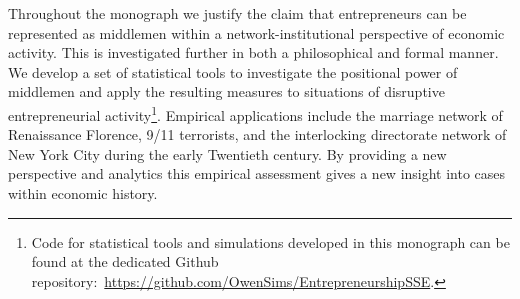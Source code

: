 \documentclass[11pt,fleqn]{book}
\begin{document}
\begin{singlespace}
Throughout the monograph we justify the claim that entrepreneurs can be represented as middlemen within a network-institutional perspective of economic activity. This is investigated further in both a philosophical and formal manner. We develop a set of statistical tools to investigate the positional power of middlemen and apply the resulting measures to situations of disruptive entrepreneurial activity\footnote{Code for statistical tools and simulations developed in this monograph can be found at the dedicated Github repository:~\href{https://github.com/OwenSims/EntrepreneurshipSSE}{https://github.com/OwenSims/EntrepreneurshipSSE}.}. Empirical applications include the marriage network of Renaissance Florence, 9/11 terrorists, and the interlocking directorate network of New York City during the early Twentieth century. By providing a new perspective and analytics this empirical assessment gives a new insight into cases within economic history.

\end{singlespace}

\newpage
\mbox{}
\thispagestyle{empty}
\newpage













\singlespace





\end{document}

